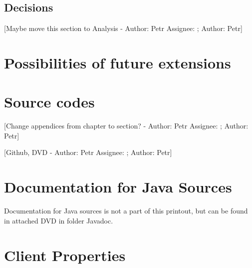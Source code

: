 \documentclass[12pt,a4paper]{report}
\makeatletter
\newcommand{\comment}[3][\@empty]{
  {\color{magenta}[#3 - }
  {\color{green}\ifx\@empty#1\relax Author: #2 \else Assignee: #1; Author: #2\fi}{\color{magenta}]}
}
\makeatother
\begin{document}
\section{Decisions}
\label{sec:Decisions}

\comment{Petr}{Maybe move this section to Analysis}

\chapter{Possibilities of future extensions}


\appendix
\chapter{Source codes}

\comment{Petr}{Change appendices from chapter to section?}

\comment{Petr}{Github, DVD}

\chapter{Documentation for Java Sources}
Documentation for Java sources is not a part of this printout, but can be found
in attached DVD in folder Javadoc.

\chapter{Client Properties}

\end{document}
